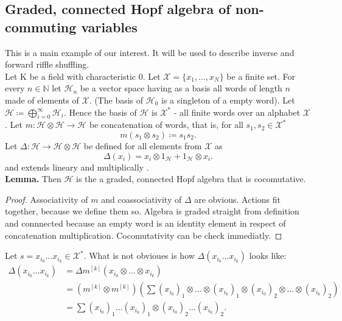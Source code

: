 \documentclass[a4paper, 12pt]{report}
\begin{document}
\subsection{Graded, connected Hopf algebra of non-commuting variables}
This is a main example of our interest. It will be used to describe inverse and forward riffle shuffling.\\
Let K be a field with characteristic 0. 
Let $\mathcal{X} = \{x_1, \dots, x_N\}$ be a finite set. For every $n \in \mathbb{N}$ let 
$\mathcal{H}_n$ be a vector space having as a basis all words of length $n$ made of elements 
of $\mathcal{X}$. (The basis of $\mathcal{H}_0$ is a singleton of a empty word). 
Let $\mathcal{H} \coloneqq \displaystyle\bigoplus^{\infty}_{i = 0} \mathcal{H}_i$. Hence 
the basis of $\mathcal{H}$ is $\mathcal{X}^*$ - all finite words over an alphabet $\mathcal{X}$.
Let $m : \mathcal{H} \otimes \mathcal{H} \to \mathcal{H}$ be concatenation of words, 
that is, for all $s_1, s_2 \in \mathcal{X}^*$
\begin{equation*}
m(s_1 \otimes s_2) \coloneqq s_1s_2.
\end{equation*}
Let $\Delta : \mathcal{H} \to \mathcal{H} \otimes \mathcal{H}$ be defined for all elements from 
$\mathcal{X}$ as
\begin{equation*}
\Delta(x_i) = x_i \otimes 1_\mathcal{H} + 1_\mathcal{H} \otimes x_i.
\end{equation*}
and extends lineary and multiplically .\\
\textbf{Lemma. } Then $\mathcal{H}$ is the a graded, connected Hopf algebra that is cocomutative.
\begin{proof}
Associativity of $m$ and coassociativity of $\Delta$ are obvious. Actions fit together, 
because we define them so. Algebra is graded straight from definition and connnected because an empty word 
is an identity element in respect of concatenation multiplication. Cocomutativity can be check immediatly.
\end{proof}
\noindent Let $s = x_{i_0}\dots x_{i_k} \in \mathcal{X}^*$. What is not obvioues is 
how $\Delta(x_{i_0}\dots x_{i_k})$ looks like:
\begin{align}
\Delta(x_{i_0}\dots x_{i_k}) &= \Delta m^{[k]}(x_{i_0} \otimes \dots \otimes x_{i_k}) \\ 
&= (m^{[k]} \otimes m^{[k]}) \left(\sum (x_{i_0})_1 \otimes \dots \otimes (x_{i_k})_1 \otimes 
(x_{i_0})_2 \otimes \dots \otimes (x_{i_k})_2\right) \\ 
&= \sum (x_{i_0})_1 \dots (x_{i_k})_1 \otimes 
(x_{i_0})_2 \dots (x_{i_k})_2.
\end{align}
\end{document}
